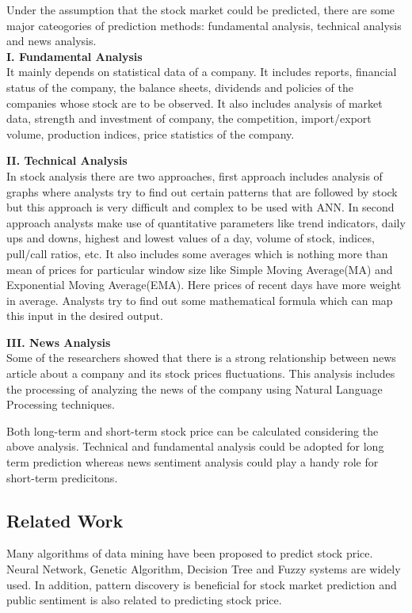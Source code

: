Under the assumption that the stock market could be predicted, there are some major cateogories of prediction methods: fundamental analysis, technical analysis and news analysis.\\

	\textbf {I. Fundamental Analysis}\\
	It mainly depends on statistical data of a company. It includes reports, financial status of the company, the balance sheets, dividends and policies of the companies whose stock are to be observed. It also includes analysis of market data, strength and investment of company, the competition, import/export volume, production indices, price statistics of the company.

	\textbf{II. Technical Analysis}\\
	In stock analysis there are two approaches, first approach includes analysis of graphs where analysts try to find out certain patterns that are followed by stock but this approach is very difficult and complex to be used with ANN. In second approach analysts make use of quantitative parameters like trend indicators, daily ups and downs, highest and lowest values of a day, volume of stock, indices, pull/call ratios, etc. It also includes some averages which is nothing more than mean of prices for particular window size like Simple Moving Average(MA) and Exponential Moving Average(EMA). Here prices of recent days have more weight in average. Analysts try to find out some mathematical formula which can map this input in the desired output.

	\textbf{III. News Analysis}\\
	Some of the researchers showed that there is a strong relationship between news article about a company and its stock prices fluctuations. This analysis includes the processing of analyzing the news of the company using Natural Language Processing techniques.

Both long-term and short-term stock price can be calculated considering the above analysis. Technical and fundamental analysis could be adopted for long term prediction whereas news sentiment analysis could play a handy role for short-term predicitons.

\subsection{Related Work}
Many algorithms of data mining have been proposed to predict stock price. Neural Network, Genetic Algorithm, Decision Tree and Fuzzy systems are widely used. In addition, pattern discovery is beneficial for stock market prediction and public sentiment is also related to predicting stock price.

